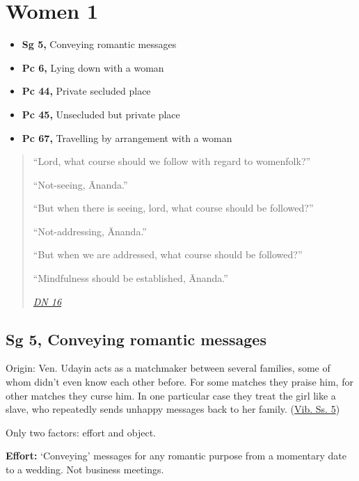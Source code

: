\chapter{Women 1}

\begin{itemize}
\tightlist
\item
  \textbf{Sg 5,} Conveying romantic messages
\item
  \textbf{Pc 6,} Lying down with a woman
\item
  \textbf{Pc 44,} Private secluded place
\item
  \textbf{Pc 45,} Unsecluded but private place
\item
  \textbf{Pc 67,} Travelling by arrangement with a woman
\end{itemize}


\begin{quote}
``Lord, what course should we follow with regard to womenfolk?''

``Not-seeing, Ānanda.''

``But when there is seeing, lord, what course should be followed?''

``Not-addressing, Ānanda.''

``But when we are addressed, what course should be followed?''

``Mindfulness should be established, Ānanda.''

\emph{\href{https://www.dhammatalks.org/suttas/DN/DN16.html}{DN 16}}
\end{quote}

\section{Sg 5, Conveying romantic messages}

Origin: Ven. Udayin acts as a matchmaker between several families, some
of whom didn't even know each other before. For some matches they praise
him, for other matches they curse him. In one particular case they treat
the girl like a slave, who repeatedly sends unhappy messages back to her
family.
(\href{https://suttacentral.net/pli-tv-bu-vb-ss5/en/brahmali}{Vib. Ss.
5})

Only two factors: effort and object.

\textbf{Effort:} `Conveying' messages for any romantic purpose from a
momentary date to a wedding. Not business meetings.

\clearpage

